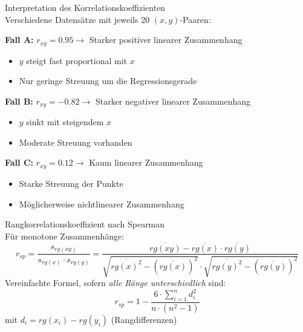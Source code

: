 \begin{example2}{Interpretation des Korrelationskoeffizienten}\\
Verschiedene Datensätze mit jeweils 20 $(x,y)$-Paaren:

\textbf{Fall A:} $r_{xy} = 0.95 \rightarrow$ Starker positiver linearer Zusammenhang
\begin{itemize}
    \item $y$ steigt fast proportional mit $x$
    \item Nur geringe Streuung um die Regressionsgerade
\end{itemize}

\textbf{Fall B:} $r_{xy} = -0.82 \rightarrow$ Starker negativer linearer Zusammenhang
\begin{itemize}
    \item $y$ sinkt mit steigendem $x$
    \item Moderate Streuung vorhanden
\end{itemize}

\textbf{Fall C:} $r_{xy} = 0.12 \rightarrow$ Kaum linearer Zusammenhang
\begin{itemize}
    \item Starke Streuung der Punkte
    \item Möglicherweise nichtlinearer Zusammenhang
\end{itemize}
\end{example2}

\begin{corollary}{Rangkorrelationskoeffizient nach Spearman}\\
Für monotone Zusammenhänge:
$$r_{sp} = \frac{s_{rg(xy)}}{s_{rg(x)} \cdot s_{rg(y)}} = \frac{\overline{rg(xy)} - \overline{rg(x)} \cdot \overline{rg(y)}}{\sqrt{\overline{rg(x)^2} - (\overline{rg(x)})^2} \cdot \sqrt{\overline{rg(y)^2} - (\overline{rg(y)})^2}}$$
Vereinfachte Formel, sofern \emph{alle Ränge unterschiedlich} sind:
$$r_{sp} = 1 - \frac{6 \cdot \sum_{i=1}^n d_i^2}{n \cdot (n^2 - 1)}$$
mit $d_i = rg(x_i) - rg(y_i)$ (Rangdifferenzen)
\end{corollary}

